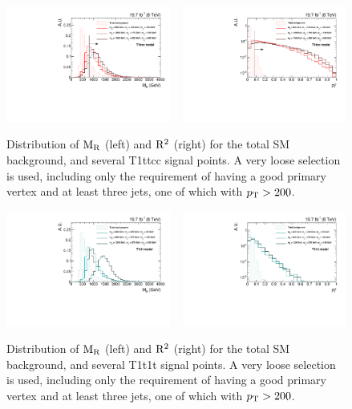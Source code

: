 \begin{figure}[tb]
\centering
\includegraphics[width=0.48\textwidth]{figures/razor_variables/T1ttcc_MR_comparison} 
~
\includegraphics[width=0.48\textwidth]{figures/razor_variables/T1ttcc_R2_comparison}
\caption{Distribution of $\mathrm{M_R}$ (left) and $\mathrm{R^2}$ (right) for the total SM background, and several
T1ttcc signal points. A very loose selection is used, including only the requirement of having a
good primary vertex and at least three jets, one of which with $p_{\mathrm{T}} > 200$\GeV. 
\label{fig:razor_MR_R2_T1ttcc}}
\end{figure}

\begin{figure}[htb]
\centering
\includegraphics[width=0.48\textwidth]{figures/razor_variables/T1t1t_MR_comparison} 
~
\includegraphics[width=0.48\textwidth]{figures/razor_variables/T1t1t_R2_comparison}
\caption{Distribution of $\mathrm{M_R}$ (left) and $\mathrm{R^2}$ (right) for the total SM background, and several
T1t1t signal points. A very loose selection is used, including only the requirement of having a good
primary vertex and at least three jets, one of which with $p_{\mathrm{T}} > 200$\GeV. 
\label{fig:razor_MR_R2_T1t1t}}
\end{figure}

